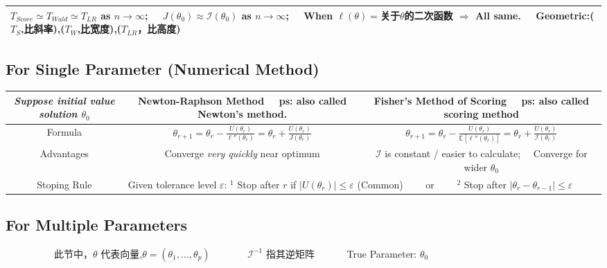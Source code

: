 \documentclass[9pt]{article}
\begin{document}
\begin{longtable}{|c|c|c|c|c|}
    \hline
    \multicolumn{5}{|l|}{\scriptsize $T_{Score}\simeq T_{Wald}\simeq T_{LR}$ as $n\to\infty$; \ \ $J(\theta_0)\approx\mathcal{I}(\theta_0)$ as $n\to\infty$; \ \ When $\ell(\theta)=$关于$\theta$的二次函数 $\Rightarrow$ All same. \ \ Geometric:($T_S$,比斜率),($T_W$,比宽度),($T_{LR}$，比高度)} \\
    \hline
\end{longtable}
\vspace{-0.35cm}

\subsection{For Single Parameter (Numerical Method)}

\vspace{-0.35cm}
\begin{longtable}{|c|c|c|}
    \hline
    {\scriptsize \textit{Suppose initial value solution $\theta_0$}} & Newton-Raphson Method \ \ {\tiny ps: also called Newton's method.} & Fisher's Method of Scoring \ \ {\tiny ps: also called scoring method} \\
    \hline
    Formula & $\theta_{r+1}=\theta_{r}-\frac{U(\theta_{r})}{\ell''(\theta_{r})}=\theta_{r}+\frac{U(\theta_{r})}{J(\theta_{r})}$ & $\theta_{r+1}=\theta_{r}-\frac{U(\theta_{r})}{\mathbb{E}[\ell''(\theta_{r})]}=\theta_{r}+\frac{U(\theta_{r})}{\mathcal{I}(\theta_{r})}$ \\
    \hline
    Advantages & {\small Converge \textit{very quickly} near optimum} & {\small $\mathcal{I}$ is constant / easier to calculate; \ \ Converge for wider $\theta_0$} \\
    \hline
    Stoping Rule & \multicolumn{2}{l|}{Given tolerance level $\varepsilon$: $^1$ Stop after $r$ if $|U(\theta_{r})|\leq\varepsilon$ {\scriptsize (Common)} \ \ \ \ {\tiny or} \ \ \ \ $^2$ Stop after $|\theta_{r}-\theta_{r-1}|\leq\varepsilon$} \\
    \hline
\end{longtable}
\vspace{-0.35cm}

\subsection{For Multiple Parameters}

\vspace{-0.25cm}
{\ \ \ \ \ \ \ \ \ \ \tiny * 此节中，$\theta$ 代表向量,$\theta=(\theta_1,...,\theta_p)$ \ \ \ \ \ \ \ $\mathbf{\mathcal{I}}^{-1}$ 指其逆矩阵 \ \ \ \ \ \ True Parameter: $\theta_0$}
\vspace{-0.15cm}
\end{document}
